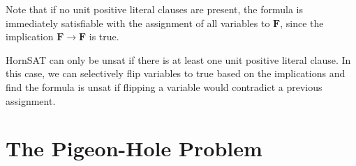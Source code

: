 \begin{enumerate}[label=(\alph*)]
    Note that if no unit positive literal clauses are present, the formula is immediately satisfiable with the assignment of all variables to $\mathbf{F}$, since the implication $\mathbf{F} \rightarrow \mathbf{F}$ is true.

    HornSAT can only be unsat if there is at least one unit positive literal clause. In this case, we can selectively flip variables to true based on the implications and find the formula is unsat if flipping a variable would contradict a previous assignment.
\end{enumerate}

\section{The Pigeon-Hole Problem}
\begin{enumerate}[label=(\alph*)]

\end{enumerate}

